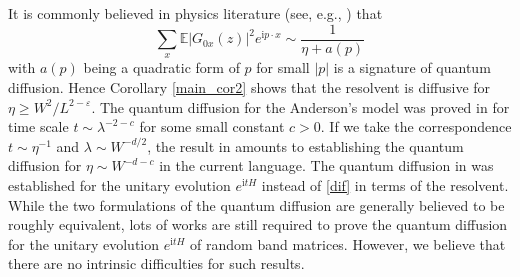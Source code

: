\documentclass{article}
\newcommand{\1}{\mathds{1}}
\numberwithin{equation}{section}
\newcommand{\be}{\begin{equation}}
\newcommand{\ee}{\end{equation}}
\newcommand{\e}{{\varepsilon}}
\renewcommand{\cal}{\mathcal}
\newcommand{\ii}{\mathrm{i}} %
\renewcommand{\geq}{\geqslant}
\renewcommand{\ge}{\geq}
\newcommand{\E}{\mathbb{E}}
\theoremstyle{plain} %
\theoremstyle{remark}
\newcommand{\cor}{\color{red}}
\newcommand{\wtSdelta}{\Sigma}
\newcommand{\hty}[1]{{\cor (ht: #1) }}
\begin{document}
It is commonly believed in physics literature (see, e.g., \cite{Spencer1,Spencer2}) that
\be\label{dif}
 \sum_x \E|G_{0x}(z)|^2 e^{\ii p \cdot x}  \sim \frac 1 { \eta + a(p)} 
\ee
with $a(p)$ being a quadratic form of $p$ for small $|p|$ is a signature of quantum diffusion. Hence Corollary \ref{main_cor2} shows that the resolvent is diffusive for  $\eta \ge W^2/L^{2-\e} $.%
The quantum diffusion for the Anderson's model was proved in \cite{ESY2008} for time scale 
$t \sim \lambda^{-2 - c }$ for some small constant $c > 0$. If we take the correspondence $t \sim \eta^{-1}$ and $\lambda \sim W^{-d/2}$, the result in \cite{ESY2008} amounts to establishing the quantum diffusion for  $\eta \sim W^{-d - c}$ in the current language. The quantum diffusion in \cite{ESY2008} was established for the unitary evolution $e^{\ii t H}$ instead of  \eqref{dif} in terms of the resolvent. {While the two formulations of the quantum diffusion are generally believed to be roughly equivalent, lots of works are still required to prove the quantum diffusion for the unitary evolution $e^{\ii t H}$ of random band matrices. However, we believe that there are no intrinsic difficulties for such results.} 





\end{document}
